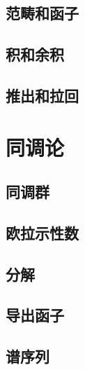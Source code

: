 \documentclass[../main.tex]{subfiles}
\begin{document}
\subsection{范畴和函子}
\subsection{积和余积}
\subsection{推出和拉回}
\section{同调论}
\subsection{同调群}
\subsection{欧拉示性数}
\subsection{分解}
\subsection{导出函子}
\subsection{谱序列}
\end{document}
